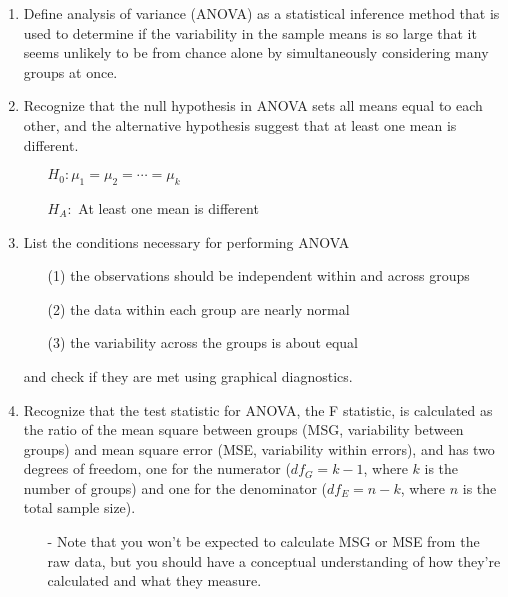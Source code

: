 \documentclass[11pt]{article}
\begin{document}
\vspace{0.48cm}

%

\begin{enumerate}[resume]
\renewcommand\labelenumi{\textcolor{light}{\textbf{LO \theenumi.}}}

\item Define analysis of variance (ANOVA) as a statistical inference method that is used to determine if the variability in the sample means is so large that it seems unlikely to be from chance alone by simultaneously considering many groups at once.

\item Recognize that the null hypothesis in ANOVA sets all means equal to each other, and the alternative hypothesis suggest that at least one mean is different.
\begin{itemize}
\item[] $H_0: \mu_1 = \mu_2 = \cdots = \mu_k$
\item[] $H_A:$ At least one mean is different
\end{itemize} 

\item List the conditions necessary for performing ANOVA
\begin{enumerate}
\item[(1)] the observations should be independent within and across groups
\item[(2)] the data within each group are nearly normal
\item[(3)] the variability across the groups is about equal
\end{enumerate}
and check if they are met using graphical diagnostics.

\item Recognize that the test statistic for ANOVA, the F statistic, is calculated as the ratio of the mean square between groups (MSG, variability between groups) and mean square error (MSE, variability within errors), and has two degrees of freedom, one for the numerator ($df_{G} = k - 1$, where $k$ is the number of groups) and one for the denominator ($df_{E} = n - k$, where $n$ is the total sample size).
\begin{itemize}
\item[-] Note that you won't be expected to calculate MSG or MSE from the raw data, but you should have a conceptual understanding of how they're calculated and what they measure.
\end{itemize} 


\end{enumerate}
\end{document}
